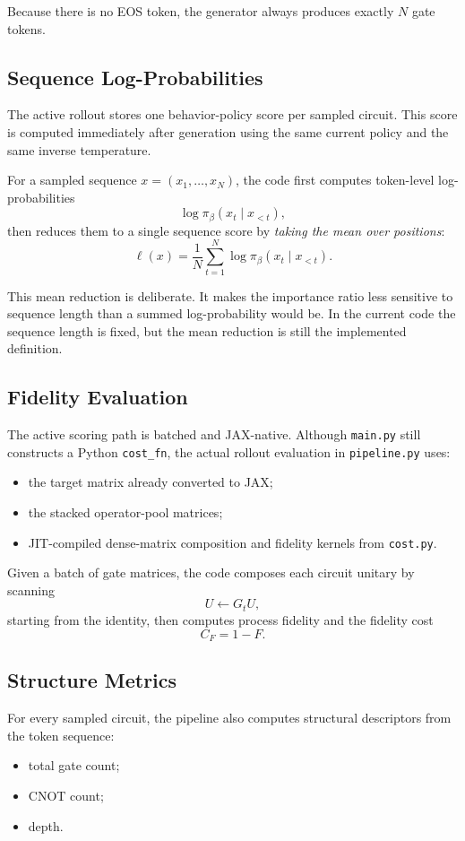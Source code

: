 \documentclass[11pt]{article}
\begin{document}
Because there is no EOS token, the generator always produces exactly $N$ gate tokens.

\subsection{Sequence Log-Probabilities}

The active rollout stores one behavior-policy score per sampled circuit. This score is computed immediately after generation using the same current policy and the same inverse temperature.

For a sampled sequence $x=(x_1,\dots,x_N)$, the code first computes token-level log-probabilities
\[
\log \pi_\beta(x_t \mid x_{<t}),
\]
then reduces them to a single sequence score by \emph{taking the mean over positions}:
\[
\ell(x)
=
\frac{1}{N}\sum_{t=1}^N \log \pi_\beta(x_t \mid x_{<t}).
\]

This mean reduction is deliberate. It makes the importance ratio less sensitive to sequence length than a summed log-probability would be. In the current code the sequence length is fixed, but the mean reduction is still the implemented definition.

\subsection{Fidelity Evaluation}

The active scoring path is batched and JAX-native. Although \texttt{main.py} still constructs a Python \texttt{cost\_fn}, the actual rollout evaluation in \texttt{pipeline.py} uses:
\begin{itemize}[leftmargin=*]
\item the target matrix already converted to JAX;
\item the stacked operator-pool matrices;
\item JIT-compiled dense-matrix composition and fidelity kernels from \texttt{cost.py}.
\end{itemize}

Given a batch of gate matrices, the code composes each circuit unitary by scanning
\[
U \leftarrow G_t U,
\]
starting from the identity, then computes process fidelity and the fidelity cost
\[
C_F = 1 - F.
\]

\subsection{Structure Metrics}

For every sampled circuit, the pipeline also computes structural descriptors from the token sequence:
\begin{itemize}[leftmargin=*]
\item total gate count;
\item CNOT count;
\item depth.
\end{itemize}
\end{document}
